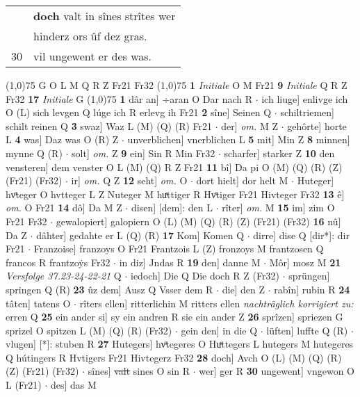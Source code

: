 \documentclass[8pt,a4paper,notitlepage]{article}
\begin{document}
\begin{table}[ht]
\begin{minipage}[t]{0.5\linewidth}
\begin{tabular}{rl}
 & \textbf{doch} valt in sînes strîtes wer\\ 
 & hinderz ors ûf dez gras.\\ 
30 & vil ungewent er des was.\\ 
\end{tabular}
\scriptsize
\line(1,0){75} \newline
G O L M Q R Z Fr21 Fr32 \newline
\line(1,0){75} \newline
\textbf{1} \textit{Initiale} O M Fr21  \textbf{9} \textit{Initiale} Q R Z Fr32  \textbf{17} \textit{Initiale} G  \newline
\line(1,0){75} \newline
\textbf{1} dâr an] ÷aran O Dar nach R  $\cdot$ ich liuge] enlivge ich O (L) sich levgen Q lúge ich R erlevg ih Fr21 \textbf{2} sîne] Seinen Q  $\cdot$ schiltriemen] schilt reinen Q \textbf{3} swaz] Waz L (M) (Q) (R) Fr21  $\cdot$ der] \textit{om.} M Z  $\cdot$ gehôrte] horte L \textbf{4} was] Daz was O (R) Z  $\cdot$ unverblichen] vnerblichen L \textbf{5} mit] Min Z \textbf{8} minnen] mynne Q (R)  $\cdot$ solt] \textit{om.} Z \textbf{9} ein] Sin R Min Fr32  $\cdot$ scharfer] starker Z \textbf{10} den vensteren] dem venster O L (M) (Q) R Z Fr21 \textbf{11} bî] Da pi O (M) (Q) (R) (Z) (Fr21) (Fr32)  $\cdot$ ir] \textit{om.} Q Z \textbf{12} seht] \textit{om.} O  $\cdot$ dort hielt] dor helt M  $\cdot$ Huteger] hvͦteger O hvtteger L Z Nuteger M huͯttiger R Hvͦtiger Fr21 Hivteger Fr32 \textbf{13} ê] \textit{om.} O Fr21 \textbf{14} dô] Da M Z  $\cdot$ disen] [dem]: den L  $\cdot$ rîter] \textit{om.} M \textbf{15} im] zim O Fr21 Fr32  $\cdot$ gewalopiert] galopiern O (L) (M) (Q) (R) (Z) (Fr21) (Fr32) \textbf{16} nû] Da Z  $\cdot$ dâhter] gedahte er L (Q) (R) \textbf{17} Kom] Komen Q  $\cdot$ dirre] dise Q [dir*]: dir Fr21  $\cdot$ Franzoise] franzoys O Fr21 Frantzois L (Z) fronzoys M frantzosen Q francos R frantzoẏs Fr32  $\cdot$ in diz] Jndas R \textbf{19} den] danne M  $\cdot$ Môr] mosz M \textbf{21} \textit{Versfolge 37.23-24-22-21} Q   $\cdot$ iedoch] Die Q Die doch R Z (Fr32)  $\cdot$ sprüngen] springen Q (R) \textbf{23} ûz dem] Ausz Q Vsser dem R  $\cdot$ die] den Z  $\cdot$ rabîn] rubin R \textbf{24} tâten] tatens O  $\cdot$ rîters ellen] ritterlichin M ritters ellen \textit{nachträglich korrigiert zu:} erren Q \textbf{25} ein ander si] sy ein andren R sie ein ander Z \textbf{26} sprîzen] spriezen G sprizel O spitzen L (M) (Q) (R) (Fr32)  $\cdot$ gein den] in die Q  $\cdot$ lüften] luffte Q (R)  $\cdot$ vlugen] [*]: stuben R \textbf{27} Hutegers] hvͦtegeres O Huͯttegers L hutegers M hutegeres Q hútingers R Hvtigers Fr21 Hivtegerz Fr32 \textbf{28} doch] Avch O (L) (M) (Q) (R) (Z) (Fr21) (Fr32)  $\cdot$ sînes] \sout{valt} sines O sin R  $\cdot$ wer] ger R \textbf{30} ungewent] vngewon O L (Fr21)  $\cdot$ des] das M \newline

\end{minipage}
\end{table}
\end{document}

